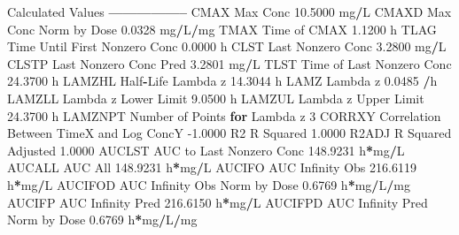 \documentclass[12pt,]{krantz}
\newenvironment{Shaded}{\begin{snugshade}}{\end{snugshade}}
\newcommand{\ControlFlowTok}[1]{\textcolor[rgb]{0.13,0.29,0.53}{\textbf{#1}}}
\newcommand{\DecValTok}[1]{\textcolor[rgb]{0.00,0.00,0.81}{#1}}
\newcommand{\FloatTok}[1]{\textcolor[rgb]{0.00,0.00,0.81}{#1}}
\newcommand{\NormalTok}[1]{#1}
\newcommand{\OperatorTok}[1]{\textcolor[rgb]{0.81,0.36,0.00}{\textbf{#1}}}
\begin{document}
\begin{Shaded}
\begin{Highlighting}[]
{{{{{{{{{{{{{{{{{{{{{{{{{{{{{{{{{{{{{{{{\NormalTok{Calculated Values}
\OperatorTok{-----------------}
\NormalTok{CMAX       Max Conc                                       }\FloatTok{10.5000}\NormalTok{ mg}\OperatorTok{/}\NormalTok{L}
\NormalTok{CMAXD      Max Conc Norm by Dose                           }\FloatTok{0.0328}\NormalTok{ mg}\OperatorTok{/}\NormalTok{L}\OperatorTok{/}\NormalTok{mg}
\NormalTok{TMAX       Time of CMAX                                    }\FloatTok{1.1200}\NormalTok{ h}
\NormalTok{TLAG       Time Until First Nonzero Conc                   }\FloatTok{0.0000}\NormalTok{ h}
\NormalTok{CLST       Last Nonzero Conc                               }\FloatTok{3.2800}\NormalTok{ mg}\OperatorTok{/}\NormalTok{L}
\NormalTok{CLSTP      Last Nonzero Conc Pred                          }\FloatTok{3.2801}\NormalTok{ mg}\OperatorTok{/}\NormalTok{L}
\NormalTok{TLST       Time of Last Nonzero Conc                      }\FloatTok{24.3700}\NormalTok{ h}
\NormalTok{LAMZHL     Half}\OperatorTok{-}\NormalTok{Life Lambda z                             }\FloatTok{14.3044}\NormalTok{ h}
\NormalTok{LAMZ       Lambda z                                        }\FloatTok{0.0485} \OperatorTok{/}\NormalTok{h}
\NormalTok{LAMZLL     Lambda z Lower Limit                            }\FloatTok{9.0500}\NormalTok{ h}
\NormalTok{LAMZUL     Lambda z Upper Limit                           }\FloatTok{24.3700}\NormalTok{ h}
\NormalTok{LAMZNPT    Number of Points }\ControlFlowTok{for}\NormalTok{ Lambda z                   }\DecValTok{3}
\NormalTok{CORRXY     Correlation Between TimeX and Log ConcY        }\FloatTok{-1.0000} 
\NormalTok{R2         R Squared                                       }\FloatTok{1.0000} 
\NormalTok{R2ADJ      R Squared Adjusted                              }\FloatTok{1.0000} 
\NormalTok{AUCLST     AUC to Last Nonzero Conc                      }\FloatTok{148.9231}\NormalTok{ h}\OperatorTok{*}\NormalTok{mg}\OperatorTok{/}\NormalTok{L}
\NormalTok{AUCALL     AUC All                                       }\FloatTok{148.9231}\NormalTok{ h}\OperatorTok{*}\NormalTok{mg}\OperatorTok{/}\NormalTok{L}
\NormalTok{AUCIFO     AUC Infinity Obs                              }\FloatTok{216.6119}\NormalTok{ h}\OperatorTok{*}\NormalTok{mg}\OperatorTok{/}\NormalTok{L}
\NormalTok{AUCIFOD    AUC Infinity Obs Norm by Dose                   }\FloatTok{0.6769}\NormalTok{ h}\OperatorTok{*}\NormalTok{mg}\OperatorTok{/}\NormalTok{L}\OperatorTok{/}\NormalTok{mg}
\NormalTok{AUCIFP     AUC Infinity Pred                             }\FloatTok{216.6150}\NormalTok{ h}\OperatorTok{*}\NormalTok{mg}\OperatorTok{/}\NormalTok{L}
\NormalTok{AUCIFPD    AUC Infinity Pred Norm by Dose                  }\FloatTok{0.6769}\NormalTok{ h}\OperatorTok{*}\NormalTok{mg}\OperatorTok{/}\NormalTok{L}\OperatorTok{/}\NormalTok{mg}
}}}}}}}}}}}}}}}}}}}}}}}}}}}}}}}}}}}}}}}}
\end{Highlighting}
\end{Shaded}
\end{document}
